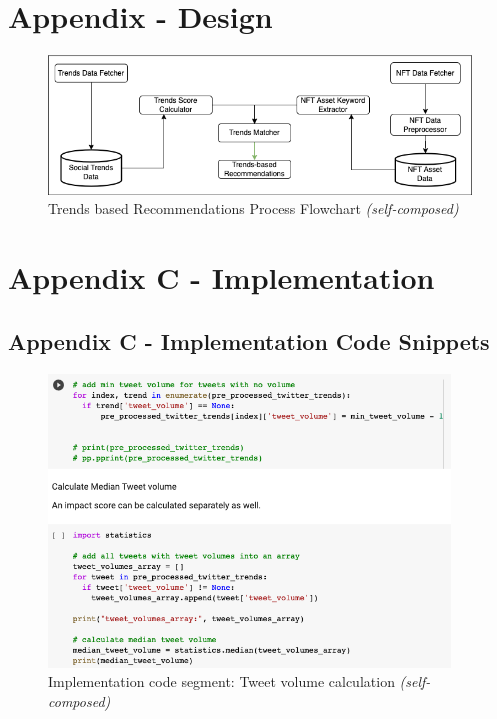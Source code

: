

\chapter{Appendix - Design}
\label{appendix:design}

\begin{figure}[h!]
\centering
\includegraphics[width=\textwidth]{images/Design/trends-system-process.png}
\caption{Trends based Recommendations Process Flowchart \textit{(self-composed)}}
\label{fig:trends-process-flowchart}
\end{figure}

\chapter{Appendix C - Implementation}
\label{appendix:implementation}

\section*{Appendix C - Implementation Code Snippets}

\begin{figure}[h!]
\centering
\includegraphics[width=0.95\textwidth]{images/Implementation/code/tweet-volume calculation.png}
\caption{Implementation code segment: Tweet volume calculation \textit{(self-composed)}}
\label{fig:code-tweet-volume-calculation}
\end{figure}

